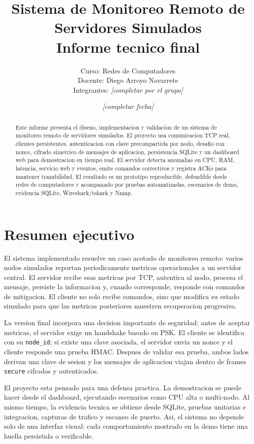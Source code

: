\documentclass[11pt,letterpaper]{article}
\title{\textbf{Sistema de Monitoreo Remoto de Servidores Simulados}\\
\large Informe tecnico final}
\author{Curso: Redes de Computadores\\
Docente: Diego Arroyo Navarrete\\
Integrantes: \textit{[completar por el grupo]}}
\date{\textit{[completar fecha]}}
\begin{document}
\maketitle

\begin{abstract}
Este informe presenta el diseno, implementacion y validacion de un sistema de
monitoreo remoto de servidores simulados. El proyecto usa comunicacion TCP real,
clientes persistentes, autenticacion con clave precompartida por nodo, desafio
con nonce, cifrado simetrico de mensajes de aplicacion, persistencia SQLite y un
dashboard web para demostracion en tiempo real. El servidor detecta anomalias en
CPU, RAM, latencia, servicio web y eventos, emite comandos correctivos y registra
ACKs para mantener trazabilidad. El resultado es un prototipo reproducible,
defendible desde redes de computadores y acompanado por pruebas automatizadas,
escenarios de demo, evidencia SQLite, Wireshark/tshark y Nmap.
\end{abstract}

\tableofcontents
\newpage

\section{Resumen ejecutivo}

El sistema implementado resuelve un caso acotado de monitoreo remoto: varios
nodos simulados reportan periodicamente metricas operacionales a un servidor
central. El servidor recibe esas metricas por TCP, autentica al nodo, procesa el
mensaje, persiste la informacion y, cuando corresponde, responde con comandos de
mitigacion. El cliente no solo recibe comandos, sino que modifica su estado
simulado para que las metricas posteriores muestren recuperacion progresiva.

La version final incorpora una decision importante de seguridad: antes de aceptar
metricas, el servidor exige un handshake basado en PSK. El cliente se identifica
con su \texttt{node\_id}; si existe una clave asociada, el servidor envia un nonce
y el cliente responde una prueba HMAC. Despues de validar esa prueba, ambos lados
derivan una clave de sesion y los mensajes de aplicacion viajan dentro de frames
\texttt{secure} cifrados y autenticados.

El proyecto esta pensado para una defensa practica. La demostracion se puede
hacer desde el dashboard, ejecutando escenarios como CPU alta o multi-nodo. Al
mismo tiempo, la evidencia tecnica se obtiene desde SQLite, pruebas unitarias e
integracion, capturas de trafico y escaneo de puerto. Asi, el sistema no depende
solo de una interfaz visual: cada comportamiento mostrado en la demo tiene una
huella persistida o verificable.
\end{document}
